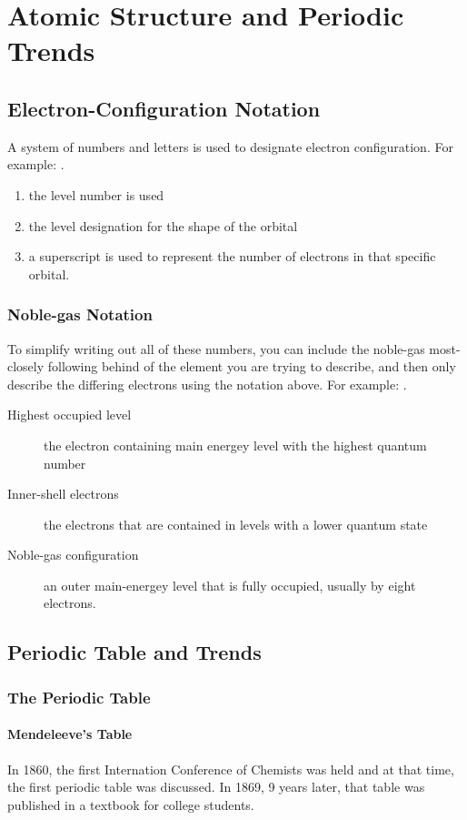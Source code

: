 \chapter{Atomic Structure and Periodic Trends}
\section{Electron-Configuration Notation}
A system of numbers and letters is used to designate electron configuration.
For example: .

\begin{enumerate}
  \item the level number is used
  \item the level designation for the shape of the orbital
  \item a superscript is used to represent the number of electrons in that
    specific orbital.
\end{enumerate}

\subsection{Noble-gas Notation}
To simplify writing out all of these numbers, you can include the noble-gas
most-closely following behind of the element you are trying to describe, and
then only describe the differing electrons using the notation above.  For
example: .

\begin{description}
  \item[Highest occupied level] the electron containing main energey level with
    the highest quantum number
  \item[Inner-shell electrons] the electrons that are contained in levels with a
    lower quantum state
  \item[Noble-gas configuration] an outer main-energey level that is fully
    occupied, usually by eight electrons.
\end{description}

\section{Periodic Table and Trends}
\subsection{The Periodic Table}
\subsubsection{Mendeleeve's Table}
In 1860, the first Internation Conference of Chemists was held and at that time,
the first periodic table was discussed.  In 1869, 9 years later, that table was
published in a textbook for college students.

